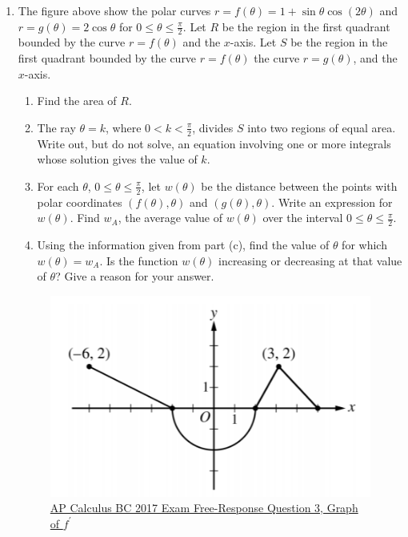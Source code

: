 \begin{enumerate}
	\item The figure above show the polar curves $r=f(\theta)=1+\sin{\theta}\cos{(2\theta)}$ and $r=g(\theta)=2\cos{\theta}$ for $0 \leq \theta \leq \frac{\pi}{2}$.
		Let $R$ be the region in the first quadrant bounded by the curve $r=f(\theta)$ and the $x$-axis.
		Let $S$ be the region in the first quadrant bounded by the curve $r=f(\theta)$ the curve $r=g(\theta)$, and the $x$-axis.
		\begin{enumerate}
			\item Find the area of $R$.
			\item The ray $\theta = k$, where $0 < k < \frac{\pi}{2}$, divides $S$ into two regions of equal area.
				Write out, but do not solve, an equation involving one or more integrals whose solution gives the value of $k$.
			\item For each $\theta$, $0 \leq \theta \leq \frac{\pi}{2}$, let $w(\theta)$ be the distance between the points with polar coordinates $(f(\theta),\theta)$ and $(g(\theta),\theta)$.
				Write an expression for $w(\theta)$.
				Find $w_A$, the average value of $w(\theta)$ over the interval $0 \leq \theta \leq \frac{\pi}{2}$.
			\item Using the information given from part (c), find the value of $\theta$ for which $w(\theta)=w_A$.
				Is the function $w(\theta)$ increasing or decreasing at that value of $\theta$?
				Give a reason for your answer.
		\end{enumerate}
	
	\begin{figure}[H]
		\label{2017_3}
		\centering
		\includegraphics{./additional_materials/2017_3.png}
		\caption{\hyperref{https://apcentral.collegeboard.org/pdf/ap-calculus-bc-frq-2017.pdf}{}{}{AP Calculus BC 2017 Exam Free-Response Question 3, Graph of $f^\prime$}}
	\end{figure}
	

\end{enumerate}
